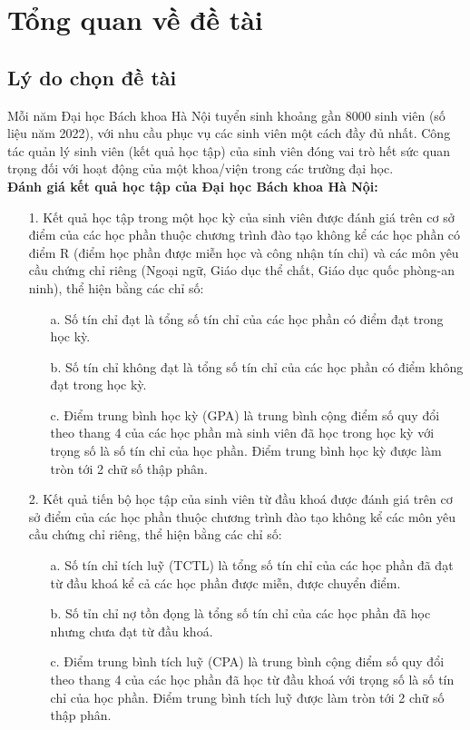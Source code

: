 \chapter{Tổng quan về đề tài}
\section{Lý do chọn đề tài}
Mỗi năm Đại học Bách khoa Hà Nội tuyển sinh khoảng gần 8000 sinh viên (số liệu năm 2022), với nhu cầu phục vụ các sinh viên một cách đầy đủ nhất.
Công tác quản lý sinh viên (kết quả học tập) của sinh viên đóng vai trò hết sức quan trọng đối với hoạt động của một khoa/viện trong các trường đại học. \\

\textbf{Đánh giá kết quả học tập của Đại học Bách khoa Hà Nội:}\textsuperscript{\cite{daotao}}
\begin{itemize}
	\item[1.] Kết quả học tập trong một học kỳ của sinh viên được đánh giá trên cơ sở điểm của các học phần thuộc chương trình đào tạo không kể các học phần có điểm R (điểm học phần được miễn học và công nhận tín chỉ) và các môn yêu cầu chứng chỉ riêng (Ngoại ngữ, Giáo dục thể chất, Giáo dục quốc phòng-an ninh), thể hiện bằng các chỉ số:
		\begin{itemize}
			\item[a.] Số tín chỉ đạt là tổng số tín chỉ của các học phần có điểm đạt trong học kỳ.
			\item[b.] Số tín chỉ không đạt là tổng số tín chỉ của các học phần có điểm không đạt trong học kỳ.
			\item[c.] Điểm trung bình học kỳ (GPA) là trung bình cộng điểm số quy đổi theo thang 4 của các học phần mà sinh viên đã học trong học kỳ với trọng số là số tín chỉ của học phần. Điểm trung bình học kỳ được làm tròn tới 2 chữ số thập phân.
		\end{itemize}
	\item[2.] Kết quả tiến bộ học tập của sinh viên từ đầu khoá được đánh giá trên cơ sở điểm của các học phần thuộc chương trình đào tạo không kể các môn yêu cầu chứng chỉ riêng, thể hiện bằng các chỉ số:
		\begin{itemize}
			\item[a.] Số tín chỉ tích luỹ (TCTL) là tổng số tín chỉ của các học phần đã đạt từ đầu khoá kể cả các học phần được miễn, được chuyển điểm.
			\item[b.] Số tỉn chỉ nợ tồn đọng là tổng số tín chỉ của các học phần đã học nhưng chưa đạt từ đầu khoá.
			\item[c.] Điểm trung bình tích luỹ (CPA) là trung bình cộng điểm số quy đổi theo thang 4 của các học phần đã học từ đầu khoá với trọng số là số tín chỉ của học phần. Điểm trung bình tích luỹ được làm tròn tới 2 chữ số thập phân.

\end{itemize}
\end{itemize}
